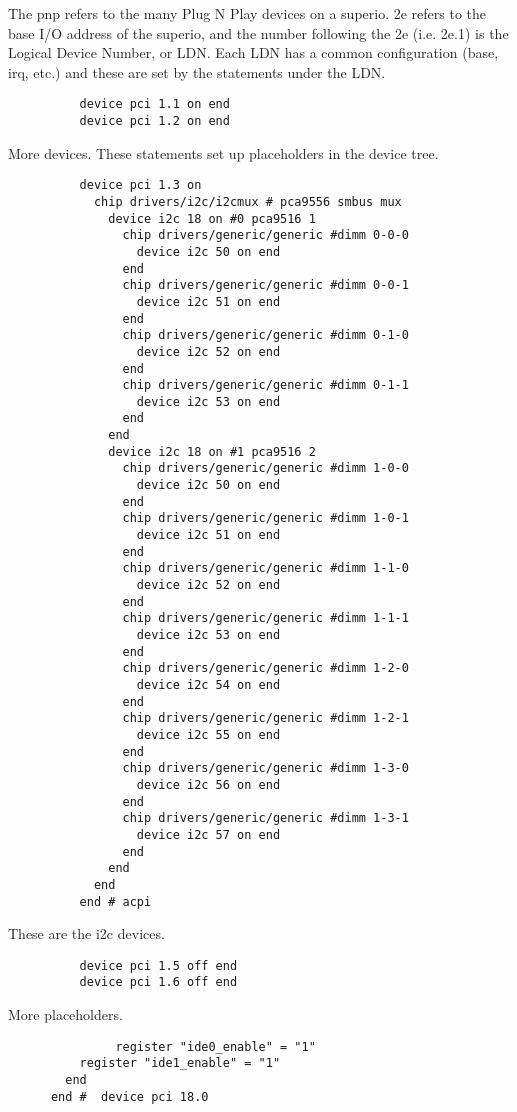 \documentclass[10pt,letterpaper]{article}
\begin{document}
The pnp refers to the many Plug N Play devices on a superio. 2e refers to the base I/O address of the superio, and the number following the
2e (i.e. 2e.1) is the Logical Device Number, or LDN. Each LDN has a common configuration (base, irq, etc.) and these are set by the statements under the LDN.
\begin{verbatim}
          device pci 1.1 on end
          device pci 1.2 on end
\end{verbatim}
More devices. These statements set up placeholders in the device tree.
\begin{verbatim}
          device pci 1.3 on
            chip drivers/i2c/i2cmux # pca9556 smbus mux
              device i2c 18 on #0 pca9516 1
                chip drivers/generic/generic #dimm 0-0-0
                  device i2c 50 on end
                end
                chip drivers/generic/generic #dimm 0-0-1
                  device i2c 51 on end
                end
                chip drivers/generic/generic #dimm 0-1-0
                  device i2c 52 on end
                end
                chip drivers/generic/generic #dimm 0-1-1
                  device i2c 53 on end
                end
              end
              device i2c 18 on #1 pca9516 2
                chip drivers/generic/generic #dimm 1-0-0
                  device i2c 50 on end
                end
                chip drivers/generic/generic #dimm 1-0-1
                  device i2c 51 on end
                end
                chip drivers/generic/generic #dimm 1-1-0
                  device i2c 52 on end
                end
                chip drivers/generic/generic #dimm 1-1-1
                  device i2c 53 on end
                end
                chip drivers/generic/generic #dimm 1-2-0
                  device i2c 54 on end
                end
                chip drivers/generic/generic #dimm 1-2-1
                  device i2c 55 on end
                end
                chip drivers/generic/generic #dimm 1-3-0
                  device i2c 56 on end
                end
                chip drivers/generic/generic #dimm 1-3-1
                  device i2c 57 on end
                end
              end
            end
          end # acpi
\end{verbatim}
These are the i2c devices.
\begin{verbatim}
          device pci 1.5 off end
          device pci 1.6 off end
\end{verbatim}
More placeholders.
\begin{verbatim}
               register "ide0_enable" = "1"
          register "ide1_enable" = "1"
        end
      end #  device pci 18.0

\end{verbatim}
\end{document}
